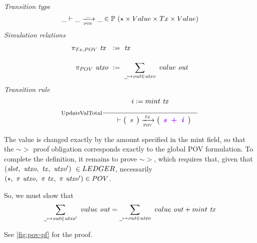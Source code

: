 \emph{Transition type}
  \begin{equation*}
    \_ \vdash
    \var{\_} \trans{pov}{\_} \var{\_}
    \in \powerset (\emptytype \times \Value \times \Tx \times \Value)
  \end{equation*}
\emph{Simulation relations}
  \begin{align*}
    \pi_{\Tx,\POV}~\var{tx}~ ~&\leteq~\var{tx}
    \nextdef
    \pi_{\POV}~\var{utxo}~&\leteq~\sum_{\wcard \mapsto \var{out}\in \var{utxo}}~\val~\var{out}
  \end{align*}
\emph{Transition rule}
  \begin{equation}
    \inference[UpdateValTotal]
    {
    i \leteq \fun{mint}~\var{tx}
    \\ ~ \\
    }
    {
    \begin{array}{l}
      \\
    \end{array}
      \vdash
      \left(
      \begin{array}{r}
        \var{s} \\
      \end{array}
      \right)
      \trans{pov}{tx}
      \left(
      \begin{array}{r}
        \varUpdate{\var{s}~+~\var{i}}  \\
      \end{array}
      \right) \\
    }
  \end{equation}

The value is
changed exactly by the amount specified in the mint field, so that the $\sim >$ proof
obligation corresponds exactly to the global POV formulation.
To complete the definition, it remains to prove
$\sim >$, which requires that, given that
$(\var{slot},~\var{utxo},~\var{tx},~\var{utxo'}) ~\in \LEDGER$,
necessarily $(\emptytype,~\pi~\var{utxo},~\pi~\var{tx},~\pi~\var{utxo'}) \in \POV$.

So, we must show that
\[ \sum_{\wcard \mapsto \var{out}\in \var{utxo'}}~\val~\var{out} = \sum_{\wcard \mapsto \var{out}\in \var{utxo}}~\val~\var{out} + \fun{mint}~\var{tx} \]

See \ref{fig:pov-pf} for the proof.



